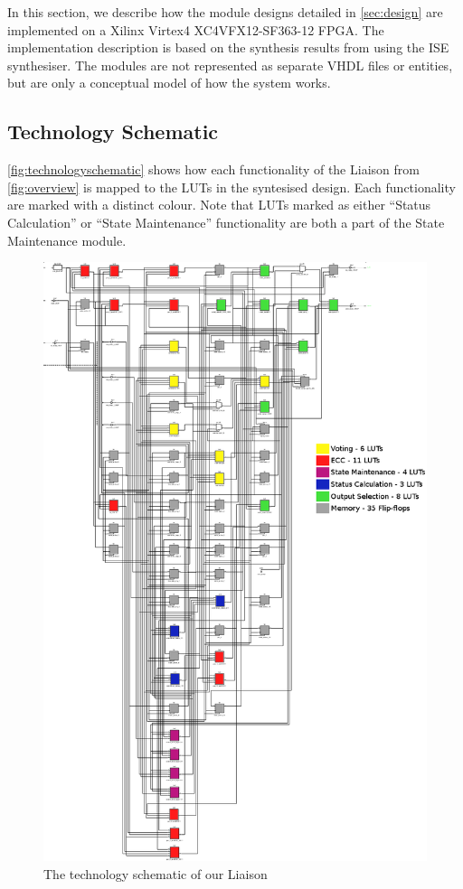 In this section, we describe how the module designs detailed in
\autoref{sec:design} are implemented on a Xilinx Virtex4
XC4VFX12-SF363-12 FPGA. The implementation description is based on the
synthesis results from using the ISE synthesiser. The modules are not represented as separate
VHDL files or entities, but are only a conceptual model of how the
system works.

\subsection{Technology Schematic}
\label{sec:technologyschematic}

\autoref{fig:technologyschematic} shows how each functionality
of the Liaison from \autoref{fig:overview} is mapped to the LUTs in
the syntesised design.  Each functionality are marked with a distinct
colour. Note that LUTs marked as either ``Status Calculation'' or
``State Maintenance'' functionality are both a part of the State
Maintenance module.


\begin{figure}[p]
  \vspace*{-1.2in}
  \centerline{ \includegraphics[width=1.2\textwidth]{LUT-count} }
  \caption{The technology schematic of our Liaison}
  \label{fig:technologyschematic}
\end{figure}

